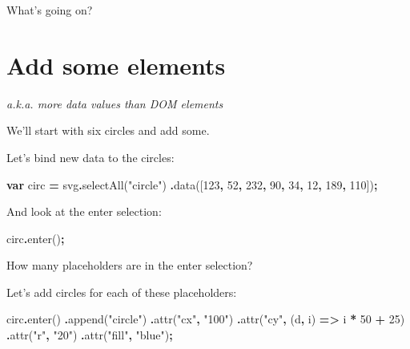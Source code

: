 \documentclass[
  openany]{book}
\newenvironment{Shaded}{\begin{snugshade}}{\end{snugshade}}
\newcommand{\DecValTok}[1]{\textcolor[rgb]{0.00,0.00,0.81}{#1}}
\newcommand{\FunctionTok}[1]{\textcolor[rgb]{0.00,0.00,0.00}{#1}}
\newcommand{\KeywordTok}[1]{\textcolor[rgb]{0.13,0.29,0.53}{\textbf{#1}}}
\newcommand{\NormalTok}[1]{#1}
\newcommand{\OperatorTok}[1]{\textcolor[rgb]{0.81,0.36,0.00}{\textbf{#1}}}
\newcommand{\StringTok}[1]{\textcolor[rgb]{0.31,0.60,0.02}{#1}}
\begin{document}
What's going on?

\hypertarget{add-some-elements}{%
\section{\texorpdfstring{Add some elements }{Add some elements }}\label{add-some-elements}}

\emph{a.k.a. more data values than DOM elements}

We'll start with six circles and add some.

Let's bind new data to the circles:

\begin{Shaded}
\begin{Highlighting}[]
\KeywordTok{var}\NormalTok{ circ }\OperatorTok{=}\NormalTok{ svg}\OperatorTok{.}\FunctionTok{selectAll}\NormalTok{(}\StringTok{"circle"}\NormalTok{)}
      \OperatorTok{.}\FunctionTok{data}\NormalTok{([}\DecValTok{123}\OperatorTok{,} \DecValTok{52}\OperatorTok{,} \DecValTok{232}\OperatorTok{,} \DecValTok{90}\OperatorTok{,} \DecValTok{34}\OperatorTok{,} \DecValTok{12}\OperatorTok{,} \DecValTok{189}\OperatorTok{,} \DecValTok{110}\NormalTok{])}\OperatorTok{;}
\end{Highlighting}
\end{Shaded}

And look at the enter selection:

\begin{Shaded}
\begin{Highlighting}[]
\NormalTok{circ}\OperatorTok{.}\FunctionTok{enter}\NormalTok{()}\OperatorTok{;}
\end{Highlighting}
\end{Shaded}

How many placeholders are in the enter selection?

Let's add circles for each of these placeholders:

\begin{Shaded}
\begin{Highlighting}[]
\NormalTok{circ}\OperatorTok{.}\FunctionTok{enter}\NormalTok{()}
    \OperatorTok{.}\FunctionTok{append}\NormalTok{(}\StringTok{"circle"}\NormalTok{)}
      \OperatorTok{.}\FunctionTok{attr}\NormalTok{(}\StringTok{"cx"}\OperatorTok{,} \StringTok{"100"}\NormalTok{)}
      \OperatorTok{.}\FunctionTok{attr}\NormalTok{(}\StringTok{"cy"}\OperatorTok{,}\NormalTok{ (d}\OperatorTok{,}\NormalTok{ i) }\KeywordTok{=\textgreater{}}\NormalTok{ i }\OperatorTok{*} \DecValTok{50} \OperatorTok{+} \DecValTok{25}\NormalTok{)}
      \OperatorTok{.}\FunctionTok{attr}\NormalTok{(}\StringTok{"r"}\OperatorTok{,} \StringTok{"20"}\NormalTok{)}
      \OperatorTok{.}\FunctionTok{attr}\NormalTok{(}\StringTok{"fill"}\OperatorTok{,} \StringTok{"blue"}\NormalTok{)}\OperatorTok{;}
\end{Highlighting}
\end{Shaded}
\end{document}
